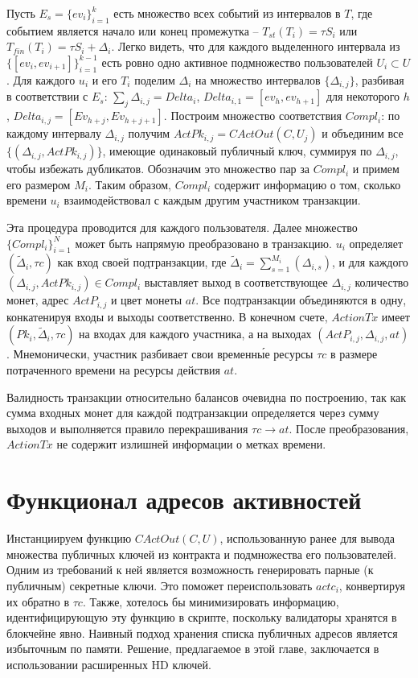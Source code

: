\documentclass[specification,annotation]{itmo-student-thesis}
\begin{document}
Пусть $E_s = \{ev_i\}_{i=1}^k$ есть множество всех событий из
интервалов в $T$, где событием является начало или конец промежутка --
$T_{st}(T_i) = \tau S_i$ или $T_{fin}(T_i) = \tau S_i +
\Delta_i$. Легко видеть, что для каждого выделенного интервала из
$\{[ev_i, ev_{i+1}]\}_{i=1}^{k-1}$ есть ровно одно активное
подмножество пользователей $U_i \subset U$. Для каждого $u_i$ и его
$T_i$ поделим $\Delta_i$ на множество интервалов $\{\Delta_{i,j}\}$,
разбивая в соответствии с $E_s$: $\sum_{j}{\Delta_{i,j}} = Delta_i$,
$Delta_{i,1} = [ev_h, ev_{h+1}]$ для некоторого $h$, $Delta_{i,j} =
[Ev_{h+j},Ev_{h+j+1}]$. Построим множество соответствия $Compl_i$: по
каждому интервалу $\Delta_{i,j}$ получим $ActPk_{i,j} = CActOut(C,
U_j)$ и объединим все $\{(\Delta_{i,j}, ActPk_{i,j})\}$, имеющие
одинаковый публичный ключ, суммируя по $\Delta_{i,j}$, чтобы избежать
дубликатов. Обозначим это множество пар за $Compl_i$ и примем его
размером $M_i$. Таким образом, $Compl_i$ содержит информацию о том,
сколько времени $u_i$ взаимодействовал с каждым другим участником
транзакции.

Эта процедура проводится для каждого пользователя. Далее множество
$\{Compl_i\}_{i=1}^N$ может быть напрямую преобразовано в
транзакцию. $u_i$ определяет $(\tilde{\Delta}_i, \tau c)$ как вход
своей подтранзакции, где $\tilde{\Delta}_i =
\sum_{s=1}^{M_i}(\Delta_{i,s})$, и для каждого $(\Delta_{i,j},
ActPk_{i,j}) \in Compl_i$ выставляет выход в соответствующее
$\Delta_{i,j}$ количество монет, адрес $ActP_{i,j}$ и цвет монеты
$at$. Все подтранзакции объединяются в одну, конкатенируя входы и
выходы соответственно. В конечном счете, $ActionTx$ имеет $(Pk_i,
\tilde{\Delta}_i, \tau c)$ на входах для каждого участника, а на
выходах $(ActP_{i,j}, \Delta_{i,j}, at)$. Мнемонически, участник
разбивает свои временн\'{ы}е ресурсы $\tau c$ в размере потраченного
времени на ресурсы действия $at$.

Валидность транзакции относительно балансов очевидна по построению,
так как сумма входных монет для каждой подтранзакции определяется
через сумму выходов и выполняется правило перекрашивания $\tau c
\rightarrow at$. После преобразования, $ActionTx$ не содержит
излишней информации о метках времени.

\section{Функционал адресов активностей}

Инстанциируем функцию $CActOut(C, U)$, использованную ранее для вывода
множества публичных ключей из контракта и подмножества его
пользователей. Одним из требований к ней является возможность
генерировать парные (к публичным) секретные ключи. Это поможет
переиспользовать $actc_i$, конвертируя их обратно в $\tau c$. Также,
хотелось бы минимизировать информацию, идентифицирующую эту функцию в
скрипте, поскольку валидаторы хранятся в блокчейне явно. Наивный
подход хранения списка публичных адресов является избыточным по
памяти. Решение, предлагаемое в этой главе, заключается в
использовании расширенных HD ключей.
\end{document}
